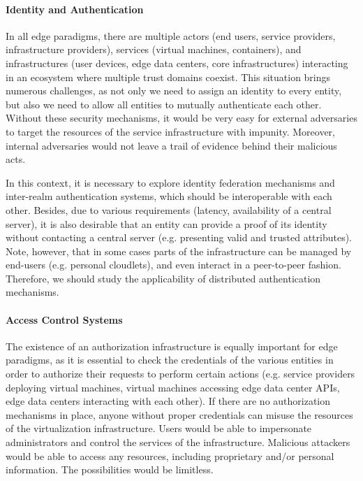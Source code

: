 \documentclass[twocolumn,preprint,3p]{elsarticle}
\begin{document}
\paragraph{Identity and Authentication} In all edge paradigms, there are multiple actors (end users, service providers, infrastructure providers), services (virtual machines, containers), and infrastructures (user devices, edge data centers, core infrastructures) interacting in an ecosystem where multiple trust domains coexist. This situation brings numerous challenges, as not only we need to assign an identity to every entity, but also we need to allow all entities to mutually authenticate each other. Without these security mechanisms, it would be very easy for external adversaries to target the resources of the service infrastructure with impunity. Moreover, internal adversaries would not leave a trail of evidence behind their malicious acts.

In this context, it is necessary to explore identity federation mechanisms and inter-realm authentication systems, which should be interoperable with each other. Besides, due to various requirements (latency, availability of a central server), it is also desirable that an entity can provide a proof of its identity without contacting a central server (e.g. presenting valid and trusted attributes). Note, however, that in some cases parts of the infrastructure can be managed by end-users (e.g. personal cloudlets), and even interact in a peer-to-peer fashion. Therefore, we should study the applicability of distributed authentication mechanisms.

\paragraph{Access Control Systems} The existence of an authorization infrastructure is equally important for edge paradigms, as it is essential to check the credentials of the various entities in order to authorize their requests to perform certain actions (e.g. service providers deploying virtual machines, virtual machines accessing edge data center APIs, edge data centers interacting with each other). If there are no authorization mechanisms in place, anyone without proper credentials can misuse the resources of the virtualization infrastructure. Users would be able to impersonate administrators and control the services of the infrastructure. Malicious attackers would be able to access any resources, including proprietary and/or personal information. The possibilities would be limitless.
\end{document}

